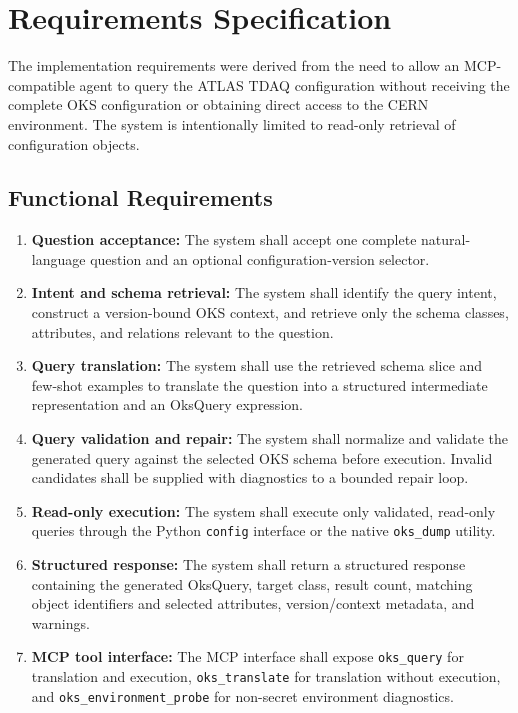 \documentclass[12pt, a4paper]{report}
\begin{document}
\section{Requirements Specification}

The implementation requirements were derived from the need to allow an MCP-compatible agent to query the ATLAS TDAQ configuration without receiving the complete OKS configuration or obtaining direct access to the CERN environment. The system is intentionally limited to read-only retrieval of configuration objects.

\subsection{Functional Requirements}
\begin{enumerate}[label=\textbf{\Roman*)}, leftmargin=*]
  \item \textbf{Question acceptance:} The system shall accept one complete natural-language question and an optional configuration-version selector.
  \item \textbf{Intent and schema retrieval:} The system shall identify the query intent, construct a version-bound OKS context, and retrieve only the schema classes, attributes, and relations relevant to the question.
  \item \textbf{Query translation:} The system shall use the retrieved schema slice and few-shot examples to translate the question into a structured intermediate representation and an OksQuery expression.
  \item \textbf{Query validation and repair:} The system shall normalize and validate the generated query against the selected OKS schema before execution. Invalid candidates shall be supplied with diagnostics to a bounded repair loop.
  \item \textbf{Read-only execution:} The system shall execute only validated, read-only queries through the Python \texttt{config} interface or the native \texttt{oks\_dump} utility.
  \item \textbf{Structured response:} The system shall return a structured response containing the generated OksQuery, target class, result count, matching object identifiers and selected attributes, version/context metadata, and warnings.
  \item \textbf{MCP tool interface:} The MCP interface shall expose \texttt{oks\_query} for translation and execution, \texttt{oks\_translate} for translation without execution, and \texttt{oks\_environment\_probe} for non-secret environment diagnostics.
\end{enumerate}
\end{document}
